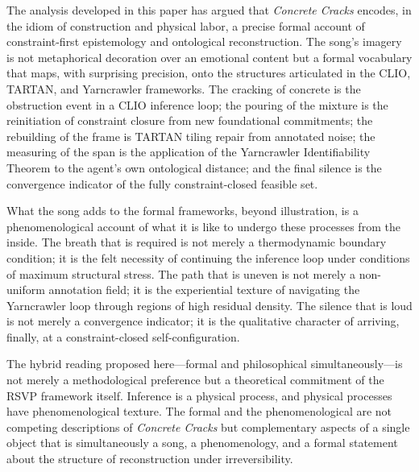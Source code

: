 \documentclass[12pt, a4paper]{article}
\begin{document}
The analysis developed in this paper has argued that \textit{Concrete Cracks} encodes, in the idiom of construction and physical labor, a precise formal account of constraint-first epistemology and ontological reconstruction. The song's imagery is not metaphorical decoration over an emotional content but a formal vocabulary that maps, with surprising precision, onto the structures articulated in the CLIO, TARTAN, and Yarncrawler frameworks. The cracking of concrete is the obstruction event in a CLIO inference loop; the pouring of the mixture is the reinitiation of constraint closure from new foundational commitments; the rebuilding of the frame is TARTAN tiling repair from annotated noise; the measuring of the span is the application of the Yarncrawler Identifiability Theorem to the agent's own ontological distance; and the final silence is the convergence indicator of the fully constraint-closed feasible set.

What the song adds to the formal frameworks, beyond illustration, is a phenomenological account of what it is like to undergo these processes from the inside. The breath that is required is not merely a thermodynamic boundary condition; it is the felt necessity of continuing the inference loop under conditions of maximum structural stress. The path that is uneven is not merely a non-uniform annotation field; it is the experiential texture of navigating the Yarncrawler loop through regions of high residual density. The silence that is loud is not merely a convergence indicator; it is the qualitative character of arriving, finally, at a constraint-closed self-configuration.

The hybrid reading proposed here---formal and philosophical simultaneously---is not merely a methodological preference but a theoretical commitment of the RSVP framework itself. Inference is a physical process, and physical processes have phenomenological texture. The formal and the phenomenological are not competing descriptions of \textit{Concrete Cracks} but complementary aspects of a single object that is simultaneously a song, a phenomenology, and a formal statement about the structure of reconstruction under irreversibility.
\end{document}

